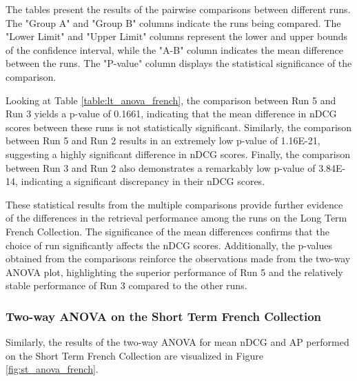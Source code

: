 The tables present the results of the pairwise comparisons between different runs. 
The "Group A" and "Group B" columns indicate the runs being compared. 
The "Lower Limit" and "Upper Limit" columns represent the lower and upper bounds of the confidence interval, while the "A-B" column indicates the mean difference between the runs. 
The "P-value" column displays the statistical significance of the comparison.

Looking at Table \ref{table:lt_anova_french}, the comparison between Run 5 and Run 3 yields a p-value of 0.1661, indicating that the mean difference in \ac{nDCG} scores between these runs is not statistically significant. 
Similarly, the comparison between Run 5 and Run 2 results in an extremely low p-value of 1.16E-21, suggesting a highly significant difference in \ac{nDCG} scores. 
Finally, the comparison between Run 3 and Run 2 also demonstrates a remarkably low p-value of 3.84E-14, indicating a significant discrepancy in their \ac{nDCG} scores.

These statistical results from the multiple comparisons provide further evidence of the differences in the retrieval performance among the runs on the Long Term French Collection. 
The significance of the mean differences confirms that the choice of run significantly affects the \ac{nDCG} scores. 
Additionally, the p-values obtained from the comparisons reinforce the observations made from the two-way \ac{ANOVA} plot, highlighting the superior performance of Run 5 and the relatively stable performance of Run 3 compared to the other runs.

\newpage
\subsubsection{Two-way ANOVA on the Short Term French Collection}

Similarly, the results of the two-way \ac{ANOVA} for mean \ac{nDCG} and \ac{AP} performed on the Short Term French Collection are visualized in Figure \ref{fig:st_anova_french}. 

